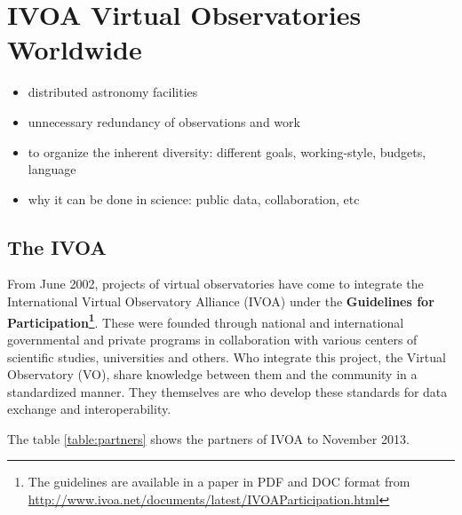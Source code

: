 \section{IVOA Virtual Observatories Worldwide}


\begin{itemize}
\item distributed astronomy facilities
\item unnecessary redundancy of observations and work
\end{itemize}


\begin{itemize}
\item to organize the inherent diversity: different goals, working-style, budgets, language
\item why it can be done in science: public data, collaboration, etc
\end{itemize}


\subsection{The IVOA}

From June 2002, projects of virtual observatories have come to integrate the
International Virtual Observatory Alliance (IVOA) under the \textbf{Guidelines
for Participation\footnote{The guidelines are available in a paper in PDF and
DOC format from
\url{http://www.ivoa.net/documents/latest/IVOAParticipation.html}}}. These were
founded through national and international governmental and private programs in
collaboration with various centers of scientific studies, universities and
others. Who integrate this project, the Virtual Observatory (VO), share
knowledge between them and the community in a standardized manner. They
themselves are who develop these standards for data exchange and
interoperability. 




The table \ref{table:partners} shows the partners of IVOA to
November 2013.\\

